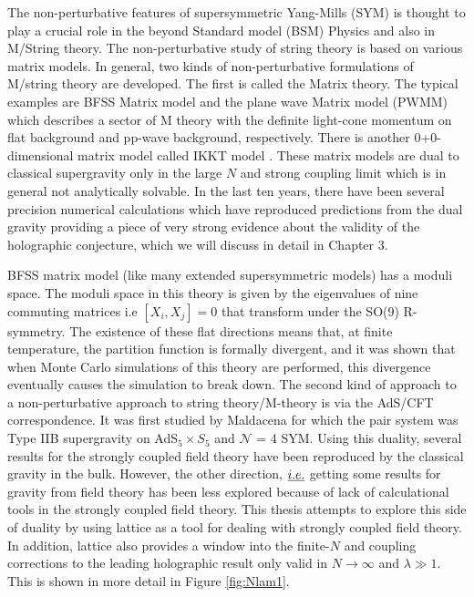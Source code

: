 The non-perturbative features of supersymmetric Yang-Mills (SYM) is thought to play a crucial role in the beyond 
Standard model (BSM) Physics and also in M/String theory. 
The non-perturbative study of string theory is based on various matrix models. 
In general, two kinds of non-perturbative formulations of M/string theory are developed. The first is called the Matrix theory. 
The typical examples are BFSS Matrix model and the
plane wave Matrix model (PWMM) which describes a sector
of M theory with the definite light-cone momentum on flat
background and pp-wave background, respectively. There is another 
0+0-dimensional matrix model called IKKT model \cite{Ishibashi:1996xs}. 
These matrix models are dual to classical supergravity only in the large $N$ and strong coupling limit which 
is in general not analytically solvable. In the last ten years, there have been several precision numerical calculations 
which have reproduced predictions from the dual gravity providing a piece of very strong evidence about the validity of 
the holographic conjecture, which we will discuss in detail in Chapter 3. 

BFSS matrix model (like many extended supersymmetric models) has a moduli space. 
The moduli space in this theory is given by the eigenvalues of nine commuting matrices i.e $ [X_{i}, X_{j}] = 0 $ 
that transform under the SO(9) R-symmetry. The existence of these flat directions means that, at finite temperature,
the partition function is formally divergent, and it was shown that when Monte
Carlo simulations of this theory are performed, this divergence eventually causes the
simulation to break down. The second kind of approach to a non-perturbative approach to string theory/M-theory 
is via the AdS/CFT correspondence. It was first studied by Maldacena for which the pair system was 
Type IIB supergravity on AdS$_5 \times S_5$ and $\mathcal{N}$ = 4 SYM.
Using this duality, several results for the strongly coupled field theory have been reproduced by the classical 
gravity in the bulk. However, the other direction, $\emph{i.e.}$
getting some results for gravity from field theory has been less explored because of lack of calculational tools in 
the strongly coupled field theory. This thesis attempts to explore this side of duality by using lattice as a tool for 
dealing with strongly coupled field theory. 
In addition, lattice also provides a window into the finite-$N$ and coupling corrections to the leading holographic 
result only valid in $N \to \infty$ and $\lambda \gg 1$. This is shown in more detail in Figure \ref{fig:Nlam1}. 


